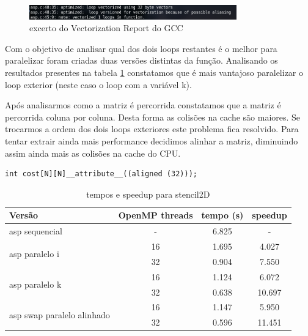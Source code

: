 \documentclass[a4paper]{report}
\begin{document}
\begin{figure}[h]
    \centering
        \includegraphics[width=0.8\textwidth]{images/asp_gcc.png}
        \caption{excerto do Vectorization Report do GCC}
        \label{fig:aspgcc}
\end{figure}

Com o objetivo de analisar qual dos dois loops restantes é o melhor para
paralelizar foram criadas duas versões distintas da função. Analisando os
resultados presentes na tabela \ref{tab:asptimes} constatamos que é mais vantajoso paralelizar o
loop exterior (neste caso o loop com a variável k).

Após analisarmos como a matriz é percorrida constatamos que a matriz é
percorrida coluna por coluna. Desta forma as colisões na cache são maiores. Se
trocarmos a ordem dos dois loops exteriores este problema fica resolvido. Para
tentar extrair ainda mais performance decidimos alinhar a matriz, diminuindo
assim ainda mais as colisões na cache do CPU.

\begin{verbatim}
int cost[N][N]__attribute__((aligned (32)));
\end{verbatim}

\begin{table}[h]
\centering
\begin{tabular}{|l|c|c|c|}
\hline
Versão & \multicolumn{1}{l|}{OpenMP threads} & \multicolumn{1}{l|}{tempo (s)} & \multicolumn{1}{l|}{speedup} \\ \hline
asp sequencial & -  & 6.825 & - \\ \hline
\multirow{2}{*}{asp paralelo i} & 16 & 1.695 & 4.027 \\ \cline{2-4}
                                & 32 & 0.904  & 7.550 \\ \hline
\multirow{2}{*}{asp paralelo k} & 16 & 1.124 & 6.072 \\ \cline{2-4}
                                & 32 & 0.638  & 10.697 \\ \hline
\multirow{2}{*}{asp swap paralelo alinhado} & 16 & 1.147 & 5.950 \\ \cline{2-4}
                                            & 32 & 0.596  & 11.451 \\ \hline
\end{tabular}
\caption{tempos e speedup para stencil2D}
\label{tab:asptimes}
\end{table}
\end{document}
